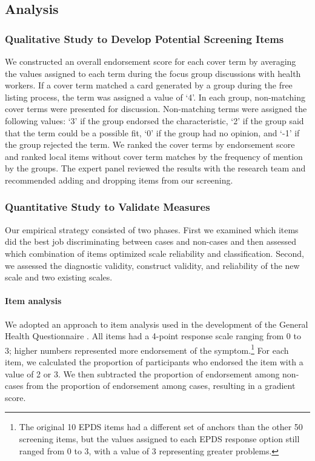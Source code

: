 \documentclass[man,natbib,longtable]{apa6}\usepackage[]{graphicx}\usepackage[]{color}
\begin{document}
\subsection{Analysis}

\subsubsection{Qualitative Study to Develop Potential Screening Items}

We constructed an overall endorsement score for each cover term by averaging the values assigned to each term during the focus group discussions with health workers. If a cover term matched a card generated by a group during the free listing process, the term was assigned a value of `4'. In each group, non-matching cover terms were presented for discussion. Non-matching terms were assigned the following values: `3' if the group endorsed the characteristic, `2' if the group said that the term could be a possible fit, `0' if the group had no opinion, and `-1' if the group rejected the term. We ranked the cover terms by endorsement score and ranked local items without cover term matches by the frequency of mention by the groups. The expert panel reviewed the results with the research team and recommended adding and dropping items from our screening.

\subsubsection{Quantitative Study to Validate Measures}

Our empirical strategy consisted of two phases. First we examined which items did the best job discriminating between cases and non-cases and then assessed which combination of items optimized scale reliability and classification. Second, we assessed the diagnostic validity, construct validity, and reliability of the new scale and two existing scales.

\paragraph{Item analysis}

We adopted an approach to item analysis used in the development of the General Health Questionnaire \citep{Goldberg:1972}. All items had a 4-point response scale ranging from 0 to 3; higher numbers represented more endorsement of the symptom.\footnote{The original 10 EPDS items had a different set of anchors than the other 50 screening items, but the values assigned to each EPDS response option still ranged from 0 to 3, with a value of 3 representing greater problems.} For each item, we calculated the proportion of participants who endorsed the item with a value of 2 or 3. We then subtracted the proportion of endorsement among non-cases from the proportion of endorsement among cases, resulting in a gradient score. 
\end{document}
